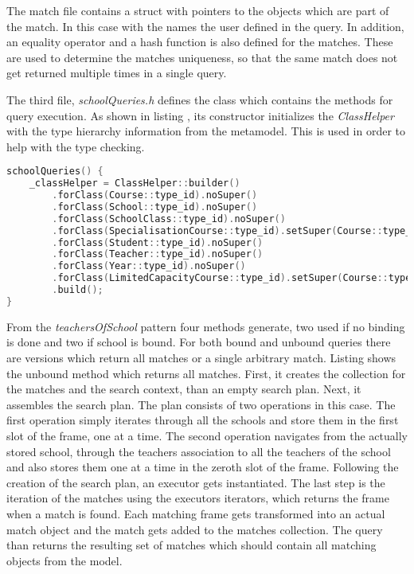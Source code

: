 The match file contains a struct with pointers to the objects which are part of
the match. In this case with the names the user defined in the query. In
addition, an equality operator and a hash function is also defined for the
matches. These are used to determine the matches uniqueness, so that the same
match does not get returned multiple times in a single query.

The third file, \emph{schoolQueries.h} defines the class which contains the
methods for query execution. As shown in listing , its
constructor initializes the \emph{ClassHelper} with the type hierarchy
information from the metamodel. This is used in order to help with the type
checking.

\begin{lstlisting}[frame=single,float=!ht,language=C++,
label=listing:tos_query_ctr, caption=The contents of
\emph{schoolQueries.h}] 
schoolQueries() {
	_classHelper = ClassHelper::builder()
		.forClass(Course::type_id).noSuper()
		.forClass(School::type_id).noSuper()
		.forClass(SchoolClass::type_id).noSuper()
		.forClass(SpecialisationCourse::type_id).setSuper(Course::type_id)
		.forClass(Student::type_id).noSuper()
		.forClass(Teacher::type_id).noSuper()
		.forClass(Year::type_id).noSuper()
		.forClass(LimitedCapacityCourse::type_id).setSuper(Course::type_id)
		.build();
}
\end{lstlisting}

From the \emph{teachersOfSchool} pattern four methods generate, two used if no
binding is done and two if school is bound. For both bound and unbound queries
there are versions which return all matches or a single arbitrary match. Listing
 shows the unbound method which returns all matches.
First, it creates the collection for the matches and the search context, than an
empty search plan. Next, it assembles the search plan. The plan consists of
two operations in this case. The first operation simply iterates through all
the schools and store them in the first slot of the frame, one at a time. The
second operation navigates from the actually stored school, through the teachers
association to all the teachers of the school and also stores them one at a time
in the zeroth slot of the frame. Following the creation of the search plan, an
executor gets instantiated. The last step is the iteration of the matches using
the executors iterators, which returns the frame when a match is found. Each
matching frame gets transformed into an actual match object and the match gets
added to the matches collection. The query than returns the resulting set of
matches which should contain all matching objects from the model.




